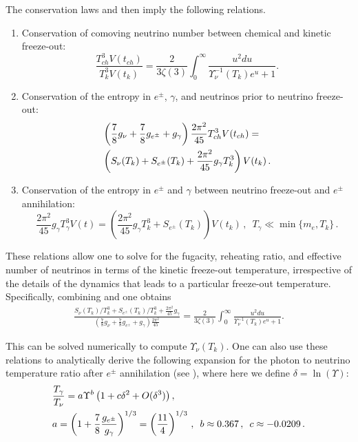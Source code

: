 The conservation laws  and  then imply the following relations.
\begin{enumerate}
\item Conservation of comoving neutrino number between chemical and kinetic freeze-out:
\begin{equation}\label{modindeq1}
\frac{T_{ch}^3V(t_{ch})}{T_k^3V(t_k)}=\frac{2}{3\zeta(3)}\int_0^\infty \frac{u^2 du}{\Upsilon_\nu^{-1}(T_k)e^u+1}.
\end{equation}
\item Conservation of the entropy in $e^\pm$, $\gamma$, and neutrinos prior to neutrino freeze-out:
\begin{align}\label{modindeq2}
&\left(\frac{7}{8}g_\nu+\frac{7}{8}g_{e^\pm} +g_\gamma \right)\frac{2\pi^2}{45} T_{ch}^3V(t_{ch})=\\
&\left(S_{\nu}(T_k)+S_{e^\pm}(T_k)+\frac{2\pi^2}{45}g_\gamma T_k^3\right)V(t_k)\,.\notag
\end{align}
\item Conservation of the entropy in $e^\pm$ and $\gamma$ between neutrino freeze-out and $e^\pm$ annihilation:
\begin{equation}\label{modindeq3}
\frac{2 \pi^2}{45}g_\gamma T_{\gamma}^3 V(t)=\left(\frac{2\pi^2}{45}g_\gamma T_k^3+S_{e^\pm}(T_k)\right)V(t_k)\,, \,\,\, T_\gamma\ll \min\{m_e, T_k\}\,.
\end{equation}
\end{enumerate}

These relations allow one to solve for the fugacity, reheating ratio, and effective number of neutrinos in terms of the kinetic freeze-out temperature, irrespective of the details of the dynamics that leads to a particular freeze-out temperature. Specifically, combining  and  one obtains
\begin{align}
 \frac{S_{\nu}(T_k)/T_k^3+S_{e^\pm}(T_k)/T_k^3+\frac{2\pi^2}{45}g_\gamma }{\left(\frac{7}{8}g_\nu+\frac{7}{8}g_{e^\pm} +g_\gamma \right)\frac{2\pi^2}{45} }=\frac{2}{3\zeta(3)}\int_0^\infty \frac{u^2 du}{\Upsilon_\nu^{-1}(T_k)e^u+1}.
\end{align}

This can be solved numerically to compute $\Upsilon_\nu(T_k)$. One can also use these relations to analytically derive the following expansion for the photon to neutrino temperature ratio after $e^\pm$ annihilation (see \cite{Birrell:2012gg}), where here we define $\delta=\ln(\Upsilon)$:
\begin{align}\label{eq:UpsilonRatio}
&\frac{T_\gamma}{T_\nu}=a\Upsilon^{b}\left(1+c\delta^2+O(\delta^3)\right),\\
\label{value_a}
&a=\left(1+\frac{7}{8}\frac{g_{e^\pm}}{g_\gamma}\right)^{1/3}=\left(\frac{11}{4}\right)^{1/3}\,,\,\,\,b\approx 0.367\,, \,\,\,c\approx -0.0209\,.\notag
\end{align}

